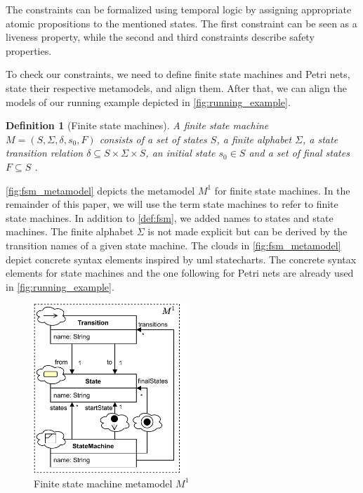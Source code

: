 \documentclass[conference]{IEEEtran}
\newtheorem{definition}{Definition}
\begin{document}
The constraints can be formalized using temporal logic by assigning appropriate atomic propositions to the mentioned states.
The first constraint can be seen as a liveness property, while the second and third constraints describe safety properties.

To check our constraints, we need to define finite state machines and Petri nets, state their respective metamodels, and align them.
After that, we can align the models of our running example depicted in \autoref{fig:running_example}.

\begin{definition}[Finite state machines] \label{def:fsm}
    A finite state machine $M=(S, \Sigma, \delta, s_0, F)$ consists of a set of states $S$, a finite alphabet $\Sigma$, a state transition relation $\delta \subseteq S \times \Sigma \times S$, an initial state $s_0 \in S$ and a set of final states $F \subseteq S$ \cite{kunzeBehaviouralModelsModelling2016}. %
\end{definition}

\autoref{fig:fsm_metamodel} depicts the metamodel $M^1$ for finite state machines.
In the remainder of this paper, we will use the term state machines to refer to finite state machines.
In addition to \autoref{def:fsm}, we added names to states and state machines.
The finite alphabet $\Sigma$ is not made explicit but can be derived by the transition names of a given state machine.
The clouds in \autoref{fig:fsm_metamodel} depict concrete syntax elements inspired by \gls{uml} statecharts.
The concrete syntax elements for state machines and the one following for Petri nets are already used in \autoref{fig:running_example}.

\begin{figure}[h]
    \centering
    \includegraphics[width=2.3in]{state_machine_metamodel}
    \caption{Finite state machine metamodel $M^1$}
    \label{fig:fsm_metamodel}
\end{figure}
\end{document}
